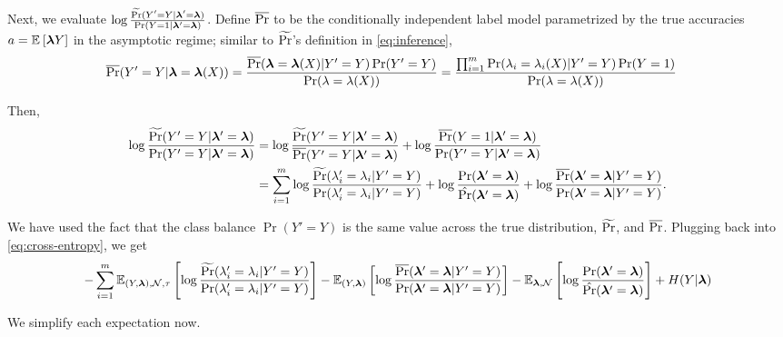 Next, we evaluate $ \log \frac{\widetilde{\Pr}(Y' = Y | \bm{\lambda}' = \bm{\lambda})}{\Pr(Y = 1 | \bm{\lambda}' = \bm{\lambda})}$. Define $\overline{\Pr}$ to be the conditionally independent label model parametrized by the true accuracies $a = \mathbb{E}_{}\left[\bm{\lambda} Y\right]$ in the asymptotic regime; similar to $\widetilde{\Pr}$'s definition in \eqref{eq:inference}, 
\begin{align}
    \overline{\Pr}(Y' = Y | \bm{\lambda} =  \bm{\lambda}(X)) &= \frac{\overline{\Pr}(\bm{\lambda} = \bm{\lambda}(X) | Y' = Y) \Pr(Y' = Y)}{\Pr(\lambda = \lambda(X))} = \frac{\prod_{i = 1}^m \Pr(\lambda_i = \lambda_i(X) | Y' = Y) \Pr(Y = 1)}{\Pr(\lambda = \lambda(X))}
\end{align}

Then, 
\begin{align*}
 \log \frac{\widetilde{\Pr}(Y' = Y | \bm{\lambda}' = \bm{\lambda})}{\Pr(Y' = Y | \bm{\lambda}' = \bm{\lambda})} &= \log \frac{\widetilde{\Pr}(Y' = Y | \bm{\lambda}' = \bm{\lambda})}{\overline{\Pr}(Y' = Y | \bm{\lambda}' = \bm{\lambda})} + \log \frac{\overline{\Pr}(Y = 1 | \bm{\lambda}' = \bm{\lambda})}{\Pr(Y' = Y | \bm{\lambda}' = \bm{\lambda})} \\
&= \sum_{i = 1}^m \log \frac{\widetilde{\Pr}(\lambda'_i = \lambda_i | Y' = Y)}{\Pr( \lambda'_i = \lambda_i | Y' = Y)} + \log \frac{\Pr(\bm{\lambda}' = \bm{\lambda})}{\hat{\Pr}(\bm{\lambda}' = \bm{\lambda})} + \log \frac{\overline{\Pr}(\bm{\lambda}' = \bm{\lambda} | Y' = Y)}{\Pr(\bm{\lambda}' = \bm{\lambda} | Y' = Y)}.
\end{align*}

We have used the fact that the class balance $\Pr(Y' = Y)$ is the same value across the true distribution, $\widetilde{\Pr}$, and $\overline{\Pr}$. Plugging back into \eqref{eq:cross-entropy}, we get 
\begin{align}
    -\sum_{i = 1}^m \mathbb{E}_{(Y, \bm{\lambda}), \mathcal{N}, \tau}\left[\log \frac{\widetilde{\Pr}(\lambda_i' = \lambda_i | Y' = Y)}{\Pr(\lambda_i' = \lambda_i | Y' = Y)}\right] - \mathbb{E}_{(Y, \bm{\lambda})}\left[\log \frac{\overline{\Pr}(\bm{\lambda}' = \bm{\lambda} | Y' = Y)}{\Pr(\bm{\lambda}' = \bm{\lambda} | Y' = Y)}\right] - \mathbb{E}_{\bm{\lambda}, \mathcal{N}}\left[\log \frac{\Pr(\bm{\lambda}' = \bm{\lambda})}{\hat{\Pr}(\bm{\lambda}' = \bm{\lambda})}\right] + H(Y | \bm{\lambda}) \label{eq:cross-entropy-2}
\end{align}

We simplify each expectation now. 

